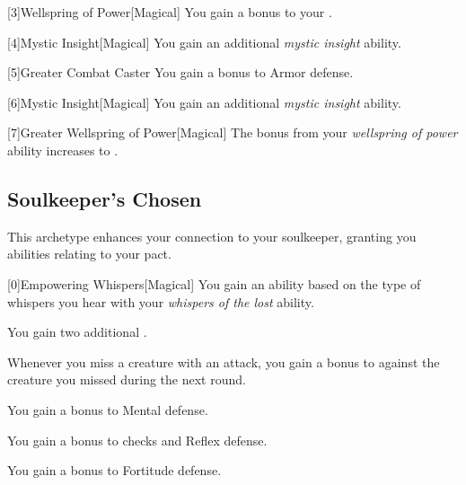         [3]{Wellspring of Power}[Magical]
        You gain a  bonus to your  .

        [4]{Mystic Insight}[Magical]
        You gain an additional \textit{mystic insight} ability.

        [5]{Greater Combat Caster} You gain a  bonus to Armor defense.

        [6]{Mystic Insight}[Magical]
        You gain an additional \textit{mystic insight} ability.

        [7]{Greater Wellspring of Power}[Magical]
        The bonus from your \textit{wellspring of power} ability increases to .

    \newpage
    \subsection{Soulkeeper's Chosen}
        This archetype enhances your connection to your soulkeeper, granting you abilities relating to your pact.

        [0]{Empowering Whispers}[Magical]
        You gain an ability based on the type of whispers you hear with your \textit{whispers of the lost} ability.
        {
             You gain two additional .

             Whenever you miss a creature with an attack, you gain a  bonus to  against the creature you missed during the next round.

             You gain a  bonus to Mental defense.

             You gain a  bonus to  checks and Reflex defense.

             You gain a  bonus to Fortitude defense.
        }

